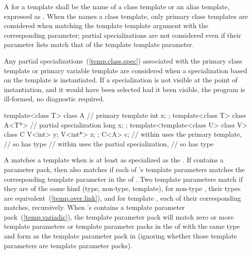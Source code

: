 \pnum
A
for a template
shall be the name of a class template or an alias template, expressed as
.
When the  names a class
template, only primary class templates are considered when matching the template template
argument with the corresponding parameter; partial specializations are not
considered even if their parameter lists match that of the template template
parameter.

\pnum
Any partial specializations~(\ref{temp.class.spec}) associated with the
primary class template or primary variable template are considered when a
specialization based on the template
is instantiated.
If a specialization is not visible at the point of instantiation,
and it would have been selected had it been visible, the program is ill-formed,
no diagnostic required.
\begin{example}

\begin{codeblock}
template<class T> class A {     // primary template
  int x;
};
template<class T> class A<T*> { // partial specialization
  long x;
};
template<template<class U> class V> class C {
  V<int>  y;
  V<int*> z;
};
C<A> c;                         //  within  uses the primary template,
                                // so  has type 
                                //  within  uses the partial specialization,
                                // so  has type 
\end{codeblock}
\end{example}

\pnum A  matches a template
  when
 is at least as specialized as the  .
If  contains a parameter pack, then  also matches 
if each of 's template parameters
matches the corresponding template parameter in the
 of .
Two template parameters match if they are of the same kind (type, non-type, template),
for non-type , their types are
equivalent~(\ref{temp.over.link}), and for template ,
each of their corresponding  matches, recursively.
When 's  contains a template parameter
pack~(\ref{temp.variadic}), the template parameter pack will match zero or more template
parameters or template parameter packs in the  of
 with the same type and form as the template parameter pack in 
(ignoring whether those template parameters are template parameter packs).

